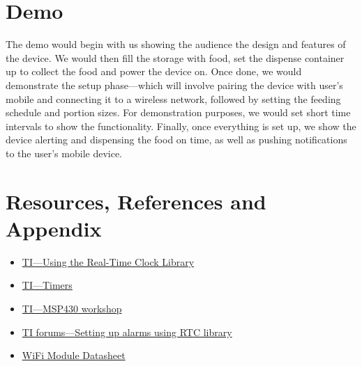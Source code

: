 \documentclass{article}
\begin{document}
\section{Demo}
The demo would begin with us showing the audience the design and features of the device. We would then fill the storage with food, set the dispense container up to collect the food and power the device on. Once done, we would demonstrate the setup phase---which will involve pairing the device with user's mobile and connecting it to a wireless network, followed by setting the feeding schedule and portion sizes. For demonstration purposes, we would set short time intervals to show the functionality. Finally, once everything is set up, we show the device alerting and dispensing the food on time, as well as pushing notifications to the user's mobile device.
\section{Resources, References and Appendix}
\begin{itemize}
    \item \href{https://www.ti.com/lit/an/slaa290a/slaa290a.pdf}{TI---Using the Real-Time Clock Library}
    \item \href{https://software-dl.ti.com/trainingTTO/trainingTTO_public_sw/MSP430_LaunchPad_Workshop/v4/Chapters/MSP430m06_TIMERS.pdf}{TI---Timers}
    \item \href{https://www.ti.com/video/series/msp430-workshop.html}{TI---MSP430 workshop}
    \item \href{https://e2e.ti.com/support/microcontrollers/msp-low-power-microcontrollers-group/msp430/f/msp-low-power-microcontroller-forum/670685/ccs-msp430fr5994-how-to-set-up-the-alarm-in-rtc-module}{TI forums---Setting up alarms using RTC library}
   \item \href{https://www.espressif.com/sites/default/files/documentation/esp32-s2_datasheet_en.pdf}{WiFi Module Datasheet}
\end{itemize}
\end{document}
